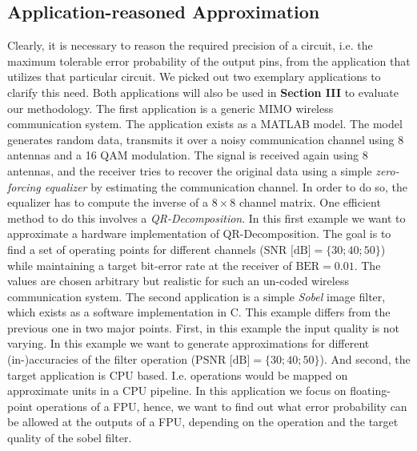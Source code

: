 \documentclass[10pt,twocolumn]{IEEEtran} %
\begin{document}
\subsection{\bf{Application-reasoned Approximation}}
\label{subsec:application_reasoned}
Clearly, it is necessary to reason the required precision of a circuit, i.e. the maximum tolerable error probability of the output pins, from the application that utilizes that particular circuit. We picked out two exemplary applications to clarify this need. Both applications will also be used in {\bf Section III} to evaluate our methodology. The first application is a generic MIMO wireless communication system. The application exists as a MATLAB model. The model generates random data, transmits it over a noisy communication channel using 8 antennas and a 16 QAM modulation. The signal is received again using 8 antennas, and the receiver tries to recover the original data using a simple \emph{zero-forcing equalizer} by estimating the communication channel. In order to do so, the equalizer has to compute the inverse of a $8\times8$ channel matrix. One efficient method to do this involves a \emph{QR-Decomposition}. In this first example we want to approximate a hardware implementation of QR-Decomposition. The goal is to find a set of operating points for different channels (\mbox{$\textrm{SNR [dB]} = \{30; 40; 50\}$}) while maintaining a target bit-error rate at the receiver of \mbox{$\textrm{BER}=0.01$}. The values are chosen arbitrary but realistic for such an un-coded wireless communication system. The second application is a simple \emph{Sobel} image filter, which exists as a software implementation in C. This example differs from the previous one in two major points. First, in this example the input quality is not varying. In this example we want to generate approximations for different (in-)accuracies of the filter operation (\mbox{$\textrm{PSNR [dB]} = \{30; 40; 50\}$}). And second, the target application is CPU based. I.e. operations would be mapped on approximate units in a CPU pipeline. In this application we focus on floating-point operations of a FPU, hence, we want to find out what error probability can be allowed at the outputs of a FPU, depending on the operation and the target quality of the sobel filter.
\end{document}
